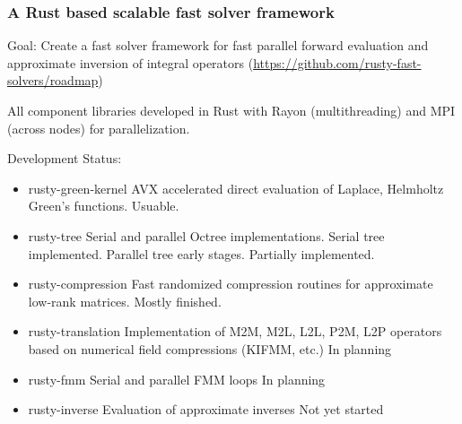 \documentclass[dvipsnames,10pt]{beamer}
\begin{document}
\begin{frame}
    \frametitle{A Rust based scalable fast solver framework}

    \vspace{.2cm}
    Goal: Create a fast solver framework for fast parallel forward evaluation and
    approximate inversion of integral operators (\url{https://github.com/rusty-fast-solvers/roadmap})

    \vspace{\baselineskip} 

    {\color{blue} All component libraries developed in Rust with Rayon (multithreading)
    and MPI (across nodes) for parallelization.}
    \vspace{\baselineskip}

    Development Status:
    \begin{itemize}
    \item {\color{blue} rusty-green-kernel} AVX accelerated direct evaluation
        of Laplace, Helmholtz Green's functions. {\color{green} Usuable}.
    \item {\color{blue} rusty-tree} Serial and parallel Octree implementations.
        Serial tree implemented. 
        Parallel tree early stages. {\color{yellow} Partially implemented}.
    \item {\color{blue} rusty-compression} Fast randomized compression routines
        for approximate low-rank matrices. {\color{yellow} Mostly finished.}
    \item {\color{blue} rusty-translation} Implementation of M2M, 
        M2L, L2L, P2M, L2P operators
        based on numerical field compressions (KIFMM, etc.)
        {\color{red} In planning}
    \item {\color{blue} rusty-fmm} Serial and parallel FMM loops 
        {\color{red} In planning}
    \item {\color{blue} rusty-inverse} Evaluation of approximate inverses 
        {\color{red} Not yet started}
    \end{itemize}

\end{frame}
\end{document}
